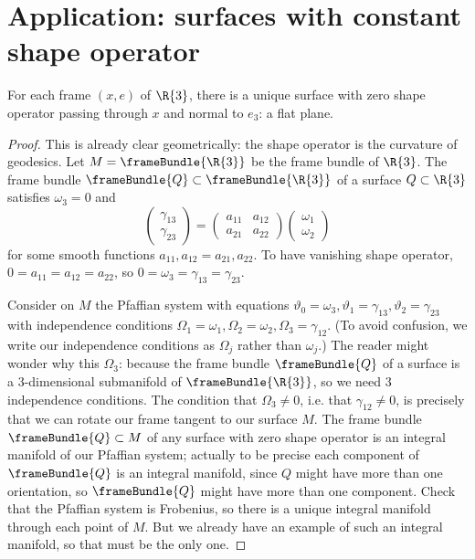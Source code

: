 \section{Application: surfaces with constant shape operator}
\begin{lemma}
For each frame \((x,e)\) of \(\R{3}\), there is a unique surface with zero shape operator passing through \(x\) and normal to \(e_3\): a flat plane.
\end{lemma}
\begin{proof}
This is already clear geometrically: the shape operator is the curvature of geodesics.
Let \(M=\frameBundle{\R{3}}\) be the frame bundle of \(\R{3}\).
The frame bundle \(\frameBundle{Q} \subset \frameBundle{\R{3}}\) of a surface \(Q \subset \R{3}\) satisfies \(\omega_3=0\) and 
\[
\begin{pmatrix}
\gamma_{13} \\
\gamma_{23} 
\end{pmatrix}
=
\begin{pmatrix}
a_{11} & a_{12} \\
a_{21} & a_{22}
\end{pmatrix}
\begin{pmatrix}
\omega_1 \\
\omega_2 
\end{pmatrix}
\]
for some smooth functions \(a_{11}, a_{12}=a_{21}, a_{22}\).
To have vanishing shape operator, \(0=a_{11}=a_{12}=a_{22}\), so
\(0=\omega_3=\gamma_{13}=\gamma_{23}\).

Consider on \(M\) the Pfaffian system with equations \(\vartheta_0 = \omega_3, \vartheta_1=\gamma_{13}, \vartheta_2=\gamma_{23}\) with independence conditions \(\Omega_1=\omega_1, \Omega_2=\omega_2, \Omega_3=\gamma_{12}\).
(To avoid confusion, we write our independence conditions as \(\Omega_j\) rather than \(\omega_j\).)
The reader might wonder why this \(\Omega_3\): because the frame bundle \(\frameBundle{Q}\) of a surface is a 3-dimensional submanifold of \(\frameBundle{\R{3}}\), so we need 3 independence conditions.
The condition that \(\Omega_3\ne 0\), i.e. that \(\gamma_{12}\ne 0\), is precisely that we can rotate our frame tangent to our surface \(M\).
The frame bundle \(\frameBundle{Q} \subset M\) of any surface with zero shape operator is an integral manifold of our Pfaffian system; actually to be precise each component of \(\frameBundle{Q}\) is an integral manifold, since \(Q\) might have more than one orientation, so \(\frameBundle{Q}\) might have more than one component.
Check that the Pfaffian system is Frobenius, so there is a unique integral manifold through 
each point of \(M\).
But we already have an example of such an integral manifold, so that must be the only one.
\end{proof}


